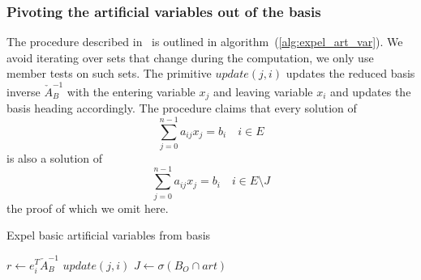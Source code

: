 \documentclass[a4paper]{article}
\begin{document}
\subsubsection{Pivoting the artificial variables out of the basis}
The procedure described in~\cite{Chvatal} is outlined in
algorithm~(\ref{alg:expel_art_var}). We avoid iterating
over sets that change during the computation, we only use member tests on such
sets. The primitive $update(j,i)$
updates the reduced basis inverse $\check{A}_{B}^{-1}$ with the entering
variable $x_{j}$ and leaving variable $x_{i}$ and updates the basis heading
accordingly. The procedure claims that every solution of 
\begin{equation}
\sum_{j=0}^{n-1}a_{ij}x_{j}=b_{i} \quad i \in E
\end{equation}
is also a solution of
\begin{equation}
\sum_{j=0}^{n-1}a_{ij}x_{j}=b_{i} \quad i \in E \setminus J
\end{equation}
the proof of which we omit here.
\begin{algorithm}
\caption{Expel basic artificial variables from basis}
\label{alg:expel_art_var}
\begin{algorithmic}[0]
        \State $r \gets e_{i}^{T}\check{A}_{B}^{-1}$
		    \State $update(j,i)$
                \EndIf
	    \EndIf
        \EndFor
    \EndIf
\EndFor
\State $J \gets \sigma(B_{O} \cap art)$
\end{algorithmic}
\end{algorithm}
\end{document}
